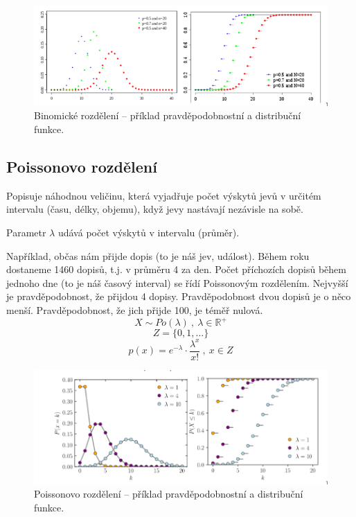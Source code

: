 \begin{figure}[H]
    \centering
    \includegraphics[width=1\linewidth]{dnp_binomicke.png}
    \caption{Binomické rozdělení -- příklad pravděpodobnostní a distribuční funkce.}
\end{figure}

\subsection{Poissonovo rozdělení}

\begin{compactitem}
    \item Popisuje náhodnou veličinu, která vyjadřuje počet výskytů jevů v určitém intervalu (času, délky, objemu), když jevy nastávají nezávisle na sobě.
    \item Parametr $\lambda$ udává počet výskytů v intervalu (průměr).
    \item Například, občas nám přijde dopis (to je náš jev, událost). Během roku dostaneme 1460 dopisů, t.j. v průměru 4 za den. Počet příchozích dopisů během jednoho dne (to je náš časový interval) se řídí Poissonovým rozdělením. Nejvyšší je pravděpodobnost, že přijdou 4 dopisy. Pravděpodobnost dvou dopisů je o něco menší. Pravděpodobnost, že jich přijde 100, je téměř nulová.
    $$ X \sim Po(\lambda) ~,~ \lambda \in \mathbb{R}^+ $$
    $$ Z = \{ 0, 1, \ldots \}$$
    $$ p(x) = e^{- \lambda} \cdot \frac{\lambda^x}{x!} ~,~ x \in Z $$
\end{compactitem}

\begin{figure}[H]
    \centering
    \includegraphics[width=1\linewidth]{dnp_poissonovo.png}
    \caption{Poissonovo rozdělení -- příklad pravděpodobnostní a distribuční funkce.}
\end{figure}

